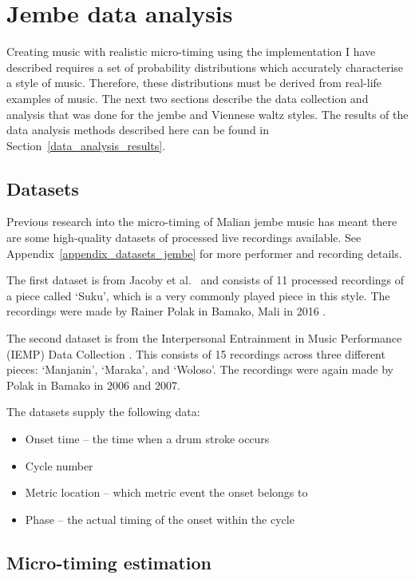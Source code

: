 \documentclass[12pt,twoside,openright]{report}
\begin{document}
\section{Jembe data analysis} \label{jembe_data_analysis}

Creating music with realistic micro-timing using the implementation I have
described requires a set of probability distributions which accurately
characterise a style of music. Therefore, these distributions must be derived
from real-life examples of music. The next two sections describe the data
collection and analysis that was done for the jembe and Viennese waltz styles.
The results of the data analysis methods described here can be found in
Section~\ref{data_analysis_results}.


\subsection{Datasets} \label{jembe_datasets}

Previous research into the micro-timing of Malian jembe music has meant there
are some high-quality datasets of processed live recordings available. See Appendix~\ref{appendix_datasets_jembe} for more performer and recording details.

The first dataset is from Jacoby et al.\ \cite{jacoby2021} and consists of 11
processed recordings of a piece called `Suku', which is a very commonly played
piece in this style. The recordings were made by Rainer Polak in Bamako, Mali in
2016 \cite{jacoby2021supp}.

The second dataset is from the Interpersonal Entrainment in Music Performance
(IEMP) Data Collection \cite{polak2020,clayton2021}. This consists of 15 recordings
across three different pieces: `Manjanin', `Maraka', and `Woloso'. The
recordings were again made by Polak in Bamako in 2006 and 2007.

The datasets supply the following data:
\begin{itemize}
	\item Onset time -- the time when a drum stroke occurs
	\item Cycle number
	\item Metric location -- which metric event the onset belongs to
	\item Phase -- the actual timing of the onset within the cycle
\end{itemize}


\subsection{Micro-timing estimation} \label{jembe_micro-timing}
\end{document}

